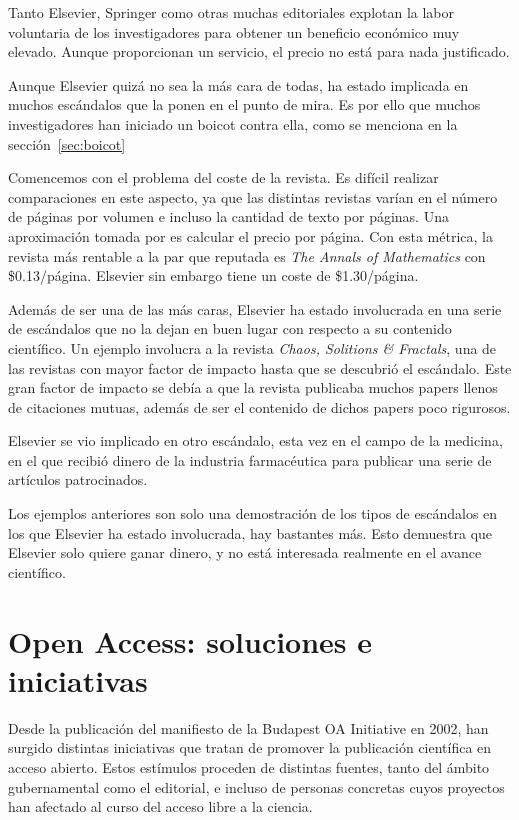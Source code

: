 Tanto Elsevier, Springer como otras muchas editoriales explotan la labor voluntaria de los investigadores para obtener un beneficio económico muy elevado. Aunque proporcionan un servicio, el precio no está para nada justificado.

Aunque Elsevier quizá no sea la más cara de todas, ha estado implicada en muchos escándalos que la ponen en el punto de mira. Es por ello que muchos investigadores han iniciado un boicot contra ella, como se menciona en la sección~\ref{sec:boicot}

Comencemos con el problema del coste de la revista. Es difícil realizar comparaciones en este aspecto, ya que las distintas revistas varían en el número de páginas por volumen e incluso la cantidad de texto por páginas. Una aproximación tomada por \cite{costknowledge} es calcular el precio por página. Con esta métrica, la revista más rentable a la par que reputada es \textit{The Annals of Mathematics} con \$0.13/página. Elsevier sin embargo tiene un coste de \$1.30/página.

Además de ser una de las más caras, Elsevier ha estado involucrada en una serie de escándalos que no la dejan en buen lugar con respecto a su contenido científico. Un ejemplo involucra a la revista \textit{Chaos, Solitions \& Fractals}, una de las revistas con mayor factor de impacto hasta que se descubrió el escándalo. Este gran factor de impacto se debía a que la revista publicaba muchos papers llenos de citaciones mutuas, además de ser el contenido de dichos papers poco rigurosos.

Elsevier se vio implicado en otro escándalo, esta vez en el campo de la medicina, en el que recibió dinero de la industria farmacéutica para publicar una serie de artículos patrocinados.

Los ejemplos anteriores son solo una demostración de los tipos de escándalos en los que Elsevier ha estado involucrada, hay bastantes más. Esto demuestra que Elsevier solo quiere ganar dinero, y no está interesada realmente en el avance científico.

\section{Open Access: soluciones e iniciativas}\label{iniciativas}

Desde la publicación del manifiesto de la Budapest OA Initiative \cite{boai} en 2002, han surgido distintas iniciativas que tratan de promover la publicación científica en acceso abierto. Estos estímulos proceden de distintas fuentes, tanto del ámbito gubernamental como el editorial, e incluso de personas concretas cuyos proyectos han afectado al curso del acceso libre a la ciencia.

